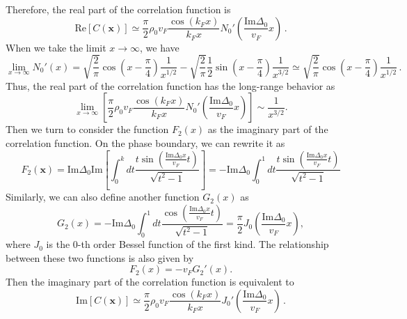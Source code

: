 \documentclass[aps,onecolumn,superscriptaddress,notitlepage,longbibliography]{revtex4-1}
\begin{document}
Therefore, the real part of the correlation function is
\begin{equation}
	\mathrm{Re}[C(\bm{x})]\simeq\frac{\pi}{2} \rho_0v_F \frac{\cos (k_F x)}{k_Fx} N_0' \left( \frac{\text{Im}
		\Delta_0}{v_F} x \right)\,.
\end{equation}
When we take the limit $x \rightarrow \infty$, we have
\begin{equation}
	\lim_{x \rightarrow \infty} N_0' (x) = \sqrt{\frac{2}{\pi}} \cos \left( x -
	\frac{\pi}{4} \right) \frac{1}{x^{1 / 2}} - \sqrt{\frac{2}{\pi}} \frac{1}{2}
	\sin \left( x - \frac{\pi}{4} \right) \frac{1}{x^{3 / 2}} \simeq 
	\sqrt{\frac{2}{\pi}} \cos \left( x - \frac{\pi}{4} \right) \frac{1}{x^{1 /
			2}}\,.
	\label{Realexact}
\end{equation}
Thus, the real part of the correlation function has the long-range behavior as
\begin{equation}
	\lim_{x \rightarrow \infty} \left[  \frac{\pi}{2} \rho_0 v_F \frac{\cos (k_F x)}{k_Fx}
	N_0' \left( \frac{\text{Im} \Delta_0}{v_F} x \right) \right] \sim \frac{1}{x^{3 / 2}}.
\end{equation}
Then we turn to consider the function $F_2(x)$ as the imaginary part of the correlation function. On the phase boundary, we can rewrite it as
\begin{equation}
	F_2(\bm{x})=\text{Im}\Delta_0\text{Im}\left[\int_0^{k} dt \frac{t\sin ( \frac{\text{Im}\Delta_0x}{v_F}
	t )}{ \sqrt{t^2 - 1}}\right]=-\text{Im}\Delta_0\int_0^{1} dt \frac{t\sin ( \frac{\text{Im}\Delta_0x}{v_F}
	t )}{ \sqrt{t^2 - 1}}
	\label{definition_of_F2}
\end{equation}
Similarly, we can also define another function $G_2(x)$ as
\begin{equation}
	G_2(x)=-\text{Im}\Delta_0\int_0^{1} dt \frac{\cos ( \frac{\text{Im}\Delta_0x}{v_F}
	t )}{ \sqrt{t^2 - 1}}=\frac{\pi}{2} J_0 \left( \frac{\text{Im}\Delta_0}{v_F} x \right),
\end{equation}
where $J_0$ is the 0-th order Bessel function of the first kind. The relationship between these two functions is also given by
\begin{equation}
	F_2 (x) = - v_F G_2' (x). %
\end{equation}
Then the imaginary part of the correlation function is equivalent to
\begin{equation}
	\mathrm{Im}[C(\bm{x})]\simeq\frac{\pi}{2} \rho_0 v_F\frac{\cos (k_F x)}{k_Fx} J_0' \left( \frac{\text{Im}
		\Delta_0}{v_F} x \right)\,.
\end{equation}
\end{document}
